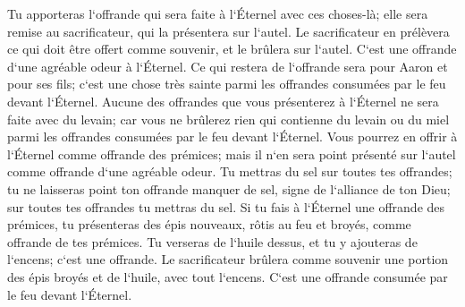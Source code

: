 \verse Tu apporteras l`offrande qui sera faite à l`Éternel avec ces choses-là; elle sera remise au sacrificateur, qui la présentera sur l`autel. 
\verse Le sacrificateur en prélèvera ce qui doit être offert comme souvenir, et le brûlera sur l`autel. C`est une offrande d`une agréable odeur à l`Éternel. 
\verse Ce qui restera de l`offrande sera pour Aaron et pour ses fils; c`est une chose très sainte parmi les offrandes consumées par le feu devant l`Éternel. 
\verse Aucune des offrandes que vous présenterez à l`Éternel ne sera faite avec du levain; car vous ne brûlerez rien qui contienne du levain ou du miel parmi les offrandes consumées par le feu devant l`Éternel. 
\verse Vous pourrez en offrir à l`Éternel comme offrande des prémices; mais il n`en sera point présenté sur l`autel comme offrande d`une agréable odeur. 
\verse Tu mettras du sel sur toutes tes offrandes; tu ne laisseras point ton offrande manquer de sel, signe de l`alliance de ton Dieu; sur toutes tes offrandes tu mettras du sel. 
\verse Si tu fais à l`Éternel une offrande des prémices, tu présenteras des épis nouveaux, rôtis au feu et broyés, comme offrande de tes prémices. 
\verse Tu verseras de l`huile dessus, et tu y ajouteras de l`encens; c`est une offrande. 
\verse Le sacrificateur brûlera comme souvenir une portion des épis broyés et de l`huile, avec tout l`encens. C`est une offrande consumée par le feu devant l`Éternel. 

